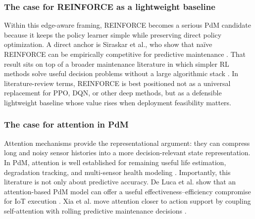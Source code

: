 \documentclass[refree,sn-basic]{sn-jnl} %
\begin{document}
\subsubsection{The case for REINFORCE as a lightweight baseline}
Within this edge-aware framing, REINFORCE becomes a serious PdM candidate because it keeps the policy learner simple while preserving direct policy optimization. A direct anchor is Siraskar et al., who show that na\"{i}ve REINFORCE can be empirically competitive for predictive maintenance \cite{Sir25}. That result sits on top of a broader maintenance literature in which simpler RL methods solve useful decision problems without a large algorithmic stack \cite{Wan14,Ads20,You20}. In literature-review terms, REINFORCE is best positioned not as a universal replacement for PPO, DQN, or other deep methods, but as a defensible lightweight baseline whose value rises when deployment feasibility matters.

\subsubsection{The case for attention in PdM}
Attention mechanisms provide the representational argument: they can compress long and noisy sensor histories into a more decision-relevant state representation. In PdM, attention is well established for remaining useful life estimation, degradation tracking, and multi-sensor health modeling \cite{Che20b,Che21e,Cha22,Luc23}. Importantly, this literature is not only about predictive accuracy. De Luca et al. show that an attention-based PdM model can offer a useful effectiveness--efficiency compromise for IoT execution \cite{Luc23}. Xia et al. move attention closer to action support by coupling self-attention with rolling predictive maintenance decisions \cite{Xia22}.
\end{document}
